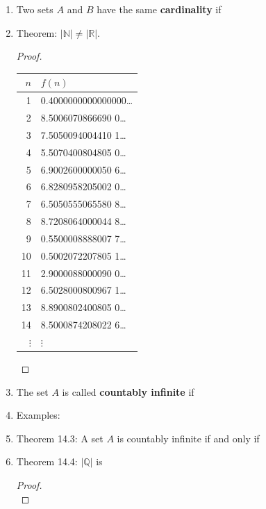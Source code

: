 \documentclass[12pt]{article}
\newcommand{\N}{\mathbb{N}}
\newcommand{\R}{\mathbb{R}}
\newcommand{\Q}{\mathbb{Q}}
\begin{document}
\begin{enumerate}
\item Two sets $A$ and $B$ have the same \textbf{cardinality} if\\
\vspace{0.6in}

\item Theorem: $|\N| \neq |\R|.$\\
\begin{proof} \quad \\

\vfill

\begin{tabular}{r|l}
$n$ & $f(n)$ \\
\hline
1 & 0.4000000000000000\ldots \\
2 & 8.5006070866690 0\ldots \\
3 & 7.5050094004410 1\ldots \\
4 & 5.5070400804805 0\ldots \\
5 & 6.9002600000050 6\ldots \\
6 & 6.8280958205002 0\ldots \\
7 & 6.5050555065580 8\ldots \\
8 & 8.7208064000044 8\ldots \\
9 & 0.5500008888007 7\ldots \\
10 & 0.5002072207805 1\ldots \\
11 & 2.9000088000090 0\ldots \\
12 & 6.5028000800967 1\ldots \\
13 & 8.8900802400805 0\ldots \\
14 & 8.5000874208022 6\ldots \\
$\vdots$ & $\vdots$ \\
\end{tabular}


\vfill
\vfill
\end{proof}
\item The set $A$ is called \textbf{countably infinite} if \\
\vfill
\item Examples: 
\newpage
\item Theorem 14.3: A set $A$ is countably infinite if and only if 
\vfill
 \item Theorem 14.4: $|\Q|$ is \\
 
 \begin{proof} \quad \\
 


\end{proof}
\end{enumerate}
\end{document}
